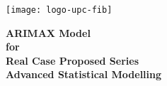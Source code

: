 
\thispagestyle{empty}
\clearpage
\setcounter{page}{-1}

\renewcommand\and{\\[\baselineskip]}

\makeatletter
\begin{titlepage}
{
    \centering
    \texttt{[image: logo-upc-fib]}
    \null%
    \vspace{3em}
    {\Huge \bfseries ARIMAX Model \\ for \\ Real Case Proposed Series \\[2em] \Large
    Advanced Statistical Modelling
    \par}
    \vspace{6em}
    {\large \scshape \@date{} \par}

    \vfill
    {\raggedleft{} \large \bfseries \@author{} \par}
    \vspace{1em}
    \null%
}
\end{titlepage}
\makeatother

